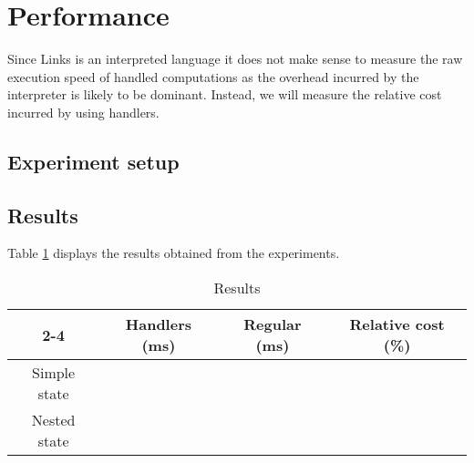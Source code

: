 \section{Performance}\label{sec:eval-performance}
Since Links is an interpreted language it does not make sense to measure the raw execution speed of handled computations as the overhead incurred by the interpreter is likely to be dominant. Instead, we will measure the relative cost incurred by using handlers.

\subsection{Experiment setup}

\subsection{Results}
Table \ref{tbl:results} displays the results obtained from the experiments.
\begin{table}[H]
  \centering
  \begin{tabular}{| c | c | c | c |}
    \cline{2-4}
    \multicolumn{1}{c |}{} & Handlers (ms) & Regular (ms) & Relative cost (\%) \\
    \hline
    Simple state & & &\\
    \hline
    Nested state & & &\\
    \hline
  \end{tabular}\caption{Results}\label{tbl:results}
\end{table}